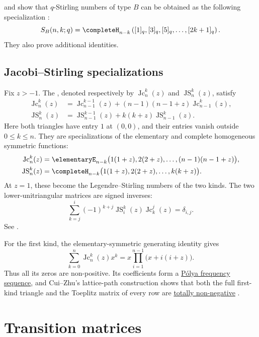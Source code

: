  and  show that
$q$-Stirling numbers of type $B$ can be obtained as the following
specialization \cite{SaganSwanson2022x}:
\[
 S_B(n,k;q) = \completeH_{n-k}\left([1]_q,[3]_q,[5]_q,\dotsc,[2k+1]_q \right).
\]
They also prove additional identities.


\subsection[jacobiStirlingSpecializations]{Jacobi--Stirling specializations}

Fix $z>-1$.  The , denoted respectively by
$\operatorname{Jc}_n^k(z)$ and $\operatorname{JS}_n^k(z)$, satisfy
\begin{align*}
 \operatorname{Jc}_n^k(z)
 &= \operatorname{Jc}_{n-1}^{k-1}(z)
    +(n-1)(n-1+z)\operatorname{Jc}_{n-1}^k(z), \\
 \operatorname{JS}_n^k(z)
 &= \operatorname{JS}_{n-1}^{k-1}(z)
    +k(k+z)\operatorname{JS}_{n-1}^k(z).
\end{align*}
Here both triangles have entry $1$ at $(0,0)$, and their entries vanish
outside $0\leq k\leq n$.  They are specializations of the elementary and
complete homogeneous symmetric functions:
\begin{align*}
 \operatorname{Jc}_n^k(z)
 &= \elementaryE_{n-k}\bigl(1(1+z),2(2+z),\dotsc,(n-1)(n-1+z)\bigr), \\
 \operatorname{JS}_n^k(z)
 &= \completeH_{n-k}\bigl(1(1+z),2(2+z),\dotsc,k(k+z)\bigr).
\end{align*}
At $z=1$, these become the Legendre--Stirling numbers of the two kinds.
The two lower-unitriangular matrices are signed inverses:
\[
 \sum_{k=j}^{i}(-1)^{k+j}
 \operatorname{JS}_i^k(z)\operatorname{Jc}_k^j(z)=\delta_{i,j}.
\]
See \cite[Secs.~7.5--7.8]{CuiZhu2023x}.

For the first kind, the elementary-symmetric generating identity gives
\[
 \sum_{k=0}^n \operatorname{Jc}_n^k(z)x^k
 =x\prod_{i=1}^{n-1}\bigl(x+i(i+z)\bigr).
\]
Thus all its zeros are non-positive.  Its coefficients form a
\hyperref[polyaFrequencySequenceDefinition]{Pólya frequency sequence}, and
Cui--Zhu's lattice-path construction shows that both the full first-kind
triangle and the Toeplitz matrix of every row are
\hyperref[totallyNonnegativeMatrix]{totally non-negative}
\cite[Sec.~7.6]{CuiZhu2023x}.




\section[symmetricTransitionMatrices]{Transition matrices}

